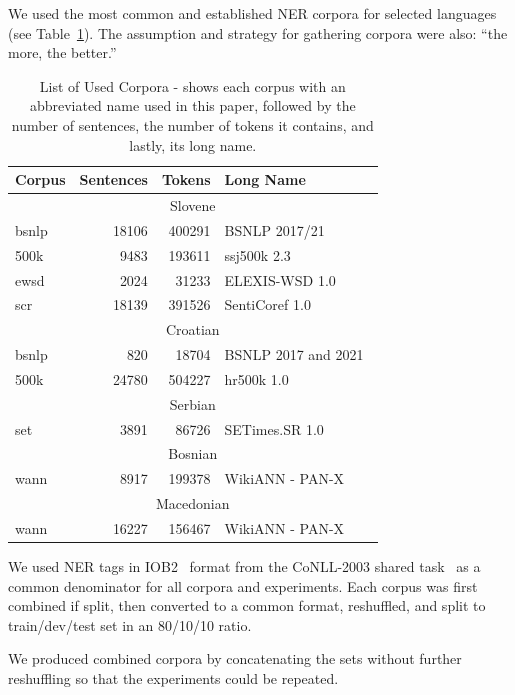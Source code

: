 \documentclass[sigconf]{acmart}
\begin{document}
We used the most common and established NER corpora for selected languages (see Table~\ref{tab:corpora}).
The assumption and strategy for gathering corpora were also: ``the more, the better.''
\begin{table}
  \caption{List of Used Corpora - shows each corpus with an abbreviated name used in this paper, followed by the number of sentences, the number of tokens it contains, and lastly, its long name.}
  \label{tab:corpora}
  \begin{tabular}{lrrl}
    \toprule
    Corpus&Sentences&Tokens&Long Name\\
    \midrule 
    \multicolumn{4}{c}{Slovene} \\
    \midrule
    bsnlp&18106&400291&BSNLP 2017/21~\cite{piskorski-etal-2021-slav}\\
    500k&9483&193611&ssj500k 2.3~\cite{ssj500k-23}\\
    ewsd&2024&31233&{ELEXIS}-{WSD} 1.0~\cite{ELEXIS-WSD-10}\\
    scr&18139&391526&{SentiCoref} 1.0~\cite{SentiCoref-10}\\
    \midrule
    \multicolumn{4}{c}{Croatian} \\
    \midrule
    bsnlp&820&18704&BSNLP 2017 and 2021~\cite{piskorski-etal-2021-slav}\\
    500k&24780&504227&hr500k 1.0 ~ \cite{hr500k-10}\\
    \midrule
    \multicolumn{4}{c}{Serbian} \\
    \midrule
    set&3891&86726&{SETimes}.{SR} 1.0~\cite{SETimes-SR-1.0}\\
    \midrule    
    \multicolumn{4}{c}{Bosnian} \\
    \midrule
    wann&8917&199378&WikiANN - PAN-X~\cite{rahimi-etal-2019-massively}\\
    \midrule    
    \multicolumn{4}{c}{Macedonian} \\
    \midrule
    wann&16227&156467&WikiANN - PAN-X~\cite{rahimi-etal-2019-massively}\\
  \bottomrule
  \end{tabular}
\end{table}

We used NER tags in IOB2~\cite{IOB2} format from the CoNLL-2003 shared task~\cite{CoNLL2003} as a common denominator for all corpora and experiments.
Each corpus was first combined if split, then converted to a common format, reshuffled, and split to train/dev/test set in an 80/10/10 ratio.

We produced combined corpora by concatenating the sets without further reshuffling so that the experiments could be repeated.
\end{document}
